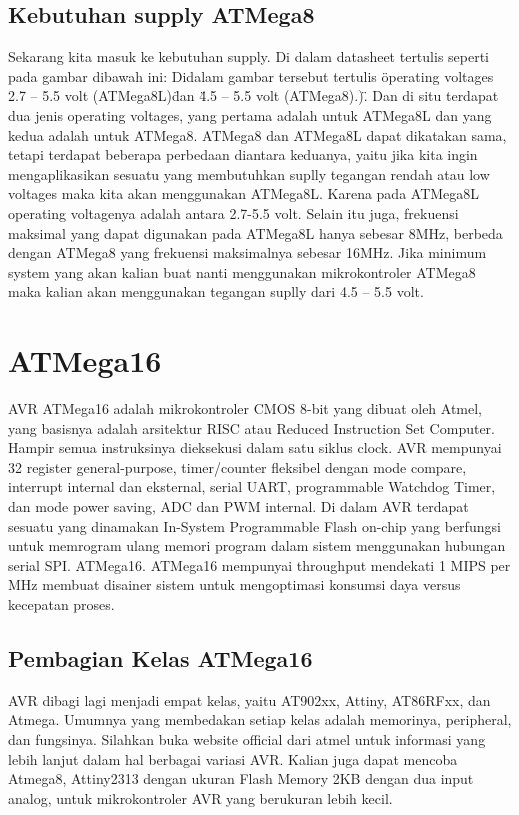 	\subsection{Kebutuhan supply ATMega8}
		Sekarang kita masuk ke kebutuhan supply. Di dalam datasheet tertulis seperti pada gambar dibawah ini:
		Didalam gambar tersebut tertulis \"operating voltages 2.7 – 5.5 volt (ATMega8L)\" dan \"4.5 – 5.5 volt (ATMega8).)\". Dan di situ terdapat dua jenis operating voltages, yang pertama adalah untuk ATMega8L dan  yang kedua adalah untuk ATMega8. ATMega8 dan ATMega8L dapat dikatakan sama, tetapi terdapat beberapa perbedaan diantara keduanya, yaitu  jika kita ingin mengaplikasikan sesuatu yang membutuhkan suplly tegangan rendah atau low voltages maka kita akan menggunakan ATMega8L. Karena pada ATMega8L operating voltagenya adalah antara 2.7-5.5 volt.
		Selain itu juga, frekuensi maksimal yang dapat digunakan pada ATMega8L hanya sebesar 8MHz, berbeda dengan ATMega8 yang frekuensi maksimalnya sebesar 16MHz. Jika minimum system yang akan kalian buat nanti menggunakan mikrokontroler ATMega8 maka kalian akan menggunakan tegangan suplly dari 4.5 – 5.5 volt.

\section{ATMega16}
		AVR ATMega16 adalah mikrokontroler CMOS 8-bit yang dibuat oleh Atmel, yang basisnya adalah arsitektur RISC atau Reduced Instruction Set Computer. Hampir semua instruksinya dieksekusi dalam satu siklus clock. AVR mempunyai 32 register general-purpose, timer/counter fleksibel dengan mode compare, interrupt internal dan eksternal, serial UART, programmable Watchdog Timer, dan mode power saving, ADC dan PWM internal. Di dalam AVR terdapat sesuatu yang dinamakan In-System Programmable Flash on-chip yang berfungsi untuk memrogram ulang memori program dalam sistem menggunakan hubungan serial SPI. ATMega16. ATMega16 mempunyai throughput mendekati 1 MIPS per MHz membuat disainer sistem untuk mengoptimasi konsumsi daya versus kecepatan proses.
	\subsection{Pembagian Kelas ATMega16}
		AVR dibagi lagi menjadi empat kelas, yaitu AT902xx, Attiny, AT86RFxx, dan Atmega. Umumnya yang membedakan setiap kelas adalah memorinya, peripheral, dan fungsinya. Silahkan buka website official dari atmel  untuk informasi yang lebih lanjut dalam hal berbagai variasi AVR. Kalian juga dapat mencoba Atmega8, Attiny2313 dengan ukuran Flash Memory 2KB dengan dua input analog, untuk mikrokontroler AVR yang berukuran lebih kecil.

